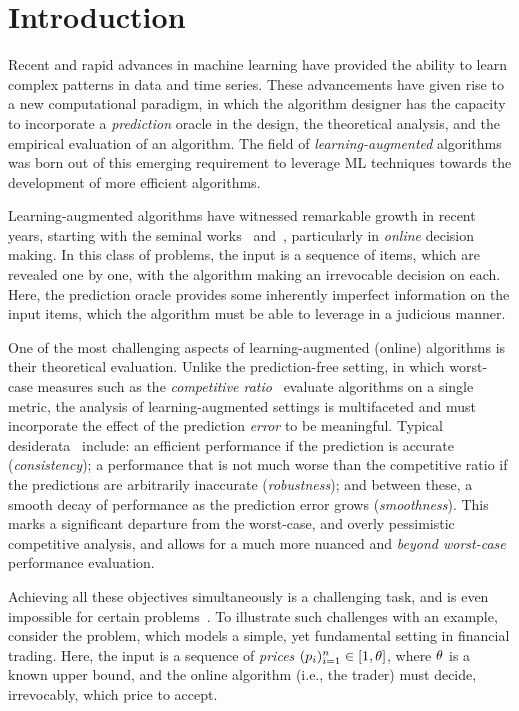 \section{Introduction}\label{sec:introduction}


 Recent and rapid advances in machine learning have provided the ability to learn complex patterns in data and time series. These advancements have given rise to a new computational paradigm, in which the algorithm designer has the capacity to incorporate a {\em prediction} oracle in the design, the theoretical analysis, and the empirical evaluation of an algorithm. The field of {\em learning-augmented} algorithms was born out of this emerging requirement to leverage ML techniques towards the development of more efficient algorithms.
 
 
 Learning-augmented algorithms have witnessed remarkable growth in recent years, starting with the seminal works~\citep{DBLP:journals/jacm/LykourisV21} and~\citep{NIPS2018_8174},
 particularly in \emph{online} decision making. In this class of problems, the input is a sequence of items, which are revealed one by one, with the algorithm making an irrevocable decision on each.
 Here, the prediction oracle provides some inherently imperfect information on the input items, which the algorithm must be able to leverage in a judicious manner.
  
One of the most challenging aspects of learning-augmented (online) algorithms is their theoretical evaluation. Unlike the prediction-free setting, in which worst-case measures such as the {\em competitive ratio}~\citep{borodin2005online} evaluate algorithms on a single metric, the analysis of learning-augmented settings is multifaceted and must incorporate the effect of the prediction {\em error} to be meaningful. Typical desiderata~\citep{DBLP:journals/jacm/LykourisV21} include: an efficient performance if the prediction is accurate ({\em consistency}); a performance that is not much worse than the competitive ratio if the predictions are arbitrarily inaccurate ({\em robustness}); and between these, a smooth decay of performance as the prediction error grows ({\em smoothness}). This marks a significant departure from the worst-case, and overly pessimistic competitive analysis, and allows for a much more nuanced and \emph{beyond worst-case} performance evaluation.

Achieving all these objectives simultaneously is a challenging task, and is even impossible for certain problems~\citep{elenter2024overcoming}. To illustrate such challenges with an example, consider the {\em \OMS{}} problem, which models a simple, yet fundamental setting in financial trading. Here, the input is a sequence of {\em prices} $(p_i)_{i=1}^n \in [1,\theta]$, where $\theta$ is a known upper bound, and the online algorithm (i.e., the trader) must decide, irrevocably, which price to accept. 

